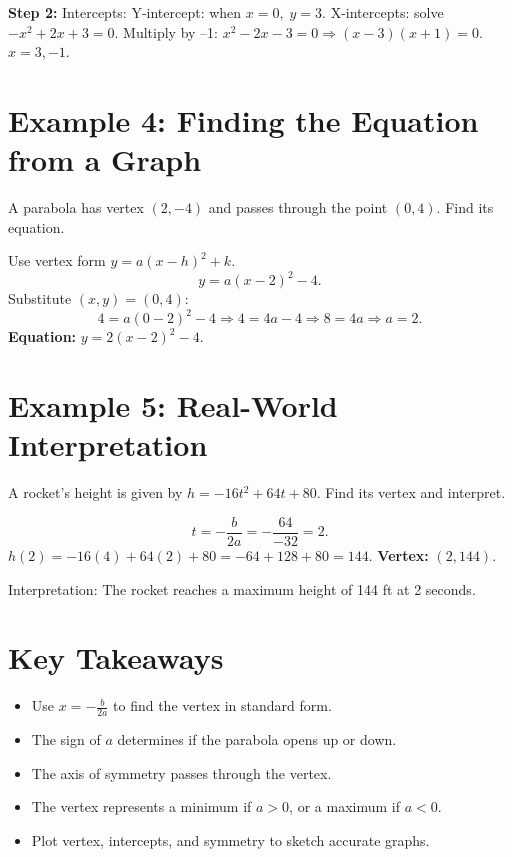 \documentclass[14pt]{extarticle}
\begin{document}
\textbf{Step 2:} Intercepts:  
Y-intercept: when \(x = 0,\; y = 3.\)  
X-intercepts: solve \(-x^2 + 2x + 3 = 0\).  
Multiply by –1: \(x^2 - 2x - 3 = 0 \Rightarrow (x - 3)(x + 1) = 0.\)  
\(\boxed{x = 3, -1}\).

\section*{Example 4: Finding the Equation from a Graph}

A parabola has vertex \((2, -4)\) and passes through the point \((0, 4)\).  
Find its equation.

Use vertex form \(y = a(x - h)^2 + k.\)
\[
y = a(x - 2)^2 - 4.
\]
Substitute \((x, y) = (0, 4):\)
\[
4 = a(0 - 2)^2 - 4 \Rightarrow 4 = 4a - 4 \Rightarrow 8 = 4a \Rightarrow a = 2.
\]
\textbf{Equation:} \(\boxed{y = 2(x - 2)^2 - 4.}\)

\section*{Example 5: Real-World Interpretation}

A rocket’s height is given by \(h = -16t^2 + 64t + 80.\)  
Find its vertex and interpret.

\[
t = -\frac{b}{2a} = -\frac{64}{-32} = 2.
\]
\(h(2) = -16(4) + 64(2) + 80 = -64 + 128 + 80 = 144.\)
\textbf{Vertex:} \((2, 144)\).

Interpretation: The rocket reaches a maximum height of 144 ft at 2 seconds.

\section*{Key Takeaways}
\begin{itemize}
  \item Use \(x = -\frac{b}{2a}\) to find the vertex in standard form.
  \item The sign of \(a\) determines if the parabola opens up or down.
  \item The axis of symmetry passes through the vertex.
  \item The vertex represents a minimum if \(a > 0\), or a maximum if \(a < 0.\)
  \item Plot vertex, intercepts, and symmetry to sketch accurate graphs.
\end{itemize}

\newpage

\end{document}
